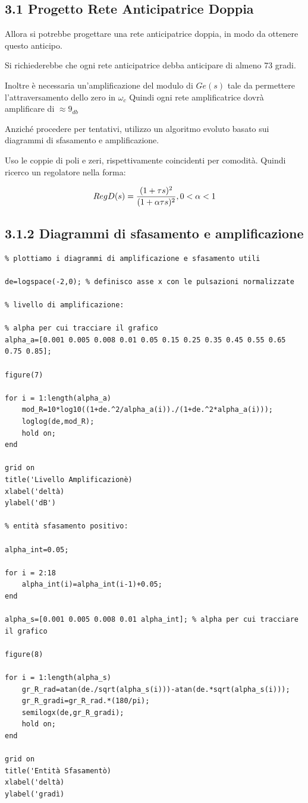 \documentclass{article}
\begin{document}
\subsection*{3.1 Progetto Rete Anticipatrice Doppia}

\begin{par}
Allora si potrebbe progettare una rete anticipatrice doppia, in modo da
ottenere questo anticipo.

Si richiederebbe che ogni rete anticipatrice debba anticipare di
almeno 73 gradi.

Inoltre è necessaria un'amplificazione del modulo di $ Ge(s) $ tale da
permettere l'attraversamento dello zero in $ \omega_c $
Quindi ogni rete amplificatrice dovrà amplificare di $  \approx 9_{db}  $

Anziché procedere per tentativi, utilizzo un algoritmo evoluto basato sui
diagrammi di sfasamento e amplificazione.

Uso le coppie di poli e zeri, rispettivamente coincidenti per comodità.
Quindi ricerco un regolatore nella forma:

$$ RegD(s) = \frac{(1 + \tau s)^2}{(1 + \alpha \tau s)^2}, \\ 0 < \alpha < 1 $$
\end{par}


\subsection*{3.1.2 Diagrammi di sfasamento e amplificazione}

\begin{verbatim}
% plottiamo i diagrammi di amplificazione e sfasamento utili

de=logspace(-2,0); % definisco asse x con le pulsazioni normalizzate

% livello di amplificazione:

% alpha per cui tracciare il grafico
alpha_a=[0.001 0.005 0.008 0.01 0.05 0.15 0.25 0.35 0.45 0.55 0.65 0.75 0.85];

figure(7)

for i = 1:length(alpha_a)
    mod_R=10*log10((1+de.^2/alpha_a(i))./(1+de.^2*alpha_a(i)));
    loglog(de,mod_R);
    hold on;
end

grid on
title('Livello Amplificazionè)
xlabel('deltà)
ylabel('dB')

% entità sfasamento positivo:

alpha_int=0.05;

for i = 2:18
    alpha_int(i)=alpha_int(i-1)+0.05;
end

alpha_s=[0.001 0.005 0.008 0.01 alpha_int]; % alpha per cui tracciare il grafico

figure(8)

for i = 1:length(alpha_s)
    gr_R_rad=atan(de./sqrt(alpha_s(i)))-atan(de.*sqrt(alpha_s(i)));
    gr_R_gradi=gr_R_rad.*(180/pi);
    semilogx(de,gr_R_gradi);
    hold on;
end

grid on
title('Entità Sfasamentò)
xlabel('deltà)
ylabel('gradì)
\end{verbatim}
\end{document}
